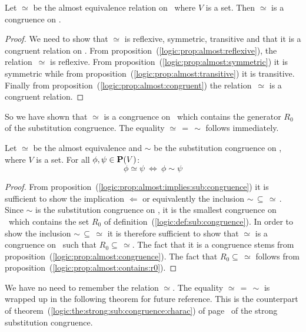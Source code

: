 \begin{prop}\label{logic:prop:almost:congruence}
Let $\simeq$ be the almost equivalence relation on \pv\ where $V$ is
a set. Then $\simeq$ is a congruence on \pv.
\end{prop}
\begin{proof}
We need to show that $\simeq$ is reflexive, symmetric, transitive
and that it is a congruent relation on \pv. From
proposition~(\ref{logic:prop:almost:reflexive}), the
relation~$\simeq$ is reflexive. From
proposition~(\ref{logic:prop:almost:symmetric}) it is symmetric
while from proposition~(\ref{logic:prop:almost:transitive}) it is
transitive. Finally from
proposition~(\ref{logic:prop:almost:congruent}) the
relation~$\simeq$ is a congruent relation.
\end{proof}

So we have shown that $\simeq$ is a congruence on \pv\ which
contains the generator $R_{0}$ of the substitution congruence. The
equality $\simeq\,=\,\sim$ follows immediately.

\begin{prop}\label{logic:prop:almost:is:sub:congruence}
Let $\simeq$ be the almost equivalence and $\sim$ be the
substitution congruence on \pv, where $V$ is a set. For all
$\phi,\psi\in\mbox{${\bf P}(V)$}$:
    \[
    \phi\simeq\psi\ \Leftrightarrow\ \phi\sim\psi
    \]
\end{prop}
\begin{proof}
From proposition~(\ref{logic:prop:almost:implies:sub:congruence}) it
is sufficient to show the implication $\Leftarrow$ or equivalently
the inclusion $\sim\,\subseteq\,\simeq\,$. Since $\sim$ is the
substitution congruence on \pv, it is the smallest congruence on
\pv\ which contains the set $R_{0}$ of
definition~(\ref{logic:def:sub:congruence}). In order to show the
inclusion $\sim\,\subseteq\,\simeq$ it is therefore sufficient to
show that $\simeq$ is a congruence on \pv\ such that
$R_{0}\subseteq\,\simeq$. The fact that it is a congruence stems
from proposition~(\ref{logic:prop:almost:congruence}). The fact that
$R_{0}\subseteq\,\simeq$ follows from
proposition~(\ref{logic:prop:almost:contains:r0}).
\end{proof}

We have no need to remember the relation $\simeq$. The equality
$\simeq\,=\,\sim$ is wrapped up in the following theorem for future
reference. This is the counterpart of
theorem~(\ref{logic:the:strong:sub:congruence:charac}) of
page~\pageref{logic:the:strong:sub:congruence:charac} of the strong
substitution congruence.

